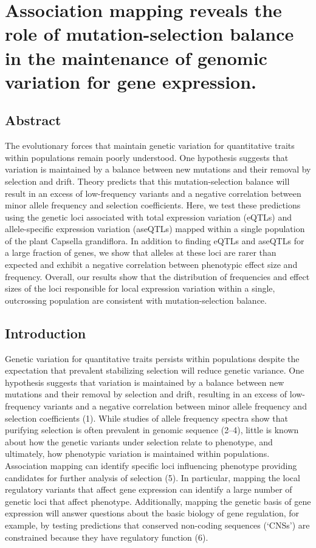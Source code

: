 \chapter{Association mapping reveals the role of mutation-selection balance in the maintenance of genomic variation for gene expression.}

\section{Abstract}
The evolutionary forces that maintain genetic variation for quantitative traits within populations remain poorly understood. One hypothesis suggests that variation is maintained by a balance between new mutations and their removal by selection and drift. Theory predicts that this mutation-selection balance will result in an excess of low-frequency variants and a negative correlation between minor allele frequency and selection coefficients. Here, we test these predictions using the genetic loci associated with total expression variation (eQTLs) and allele-specific expression variation (aseQTLs) mapped within a single population of the plant Capsella grandiflora. In addition to finding eQTLs and aseQTLs for a large fraction of genes, we show that alleles at these loci are rarer than expected and exhibit a negative correlation between phenotypic effect size and frequency. Overall, our results show that the distribution of frequencies and effect sizes of the loci responsible for local expression variation within a single, outcrossing population are consistent with mutation-selection balance.

\section{Introduction}
Genetic variation for quantitative traits persists within populations despite the expectation that prevalent stabilizing selection will reduce genetic variance. One hypothesis suggests that variation is maintained by a balance between new mutations and their removal by selection and drift, resulting in an excess of low-frequency variants and a negative correlation between minor allele frequency and selection coefficients (1). While studies of allele frequency spectra show that purifying selection is often prevalent in genomic sequence (2–4), little is known about how the genetic variants under selection relate to phenotype, and ultimately, how phenotypic variation is maintained within populations. Association mapping can identify specific loci influencing phenotype providing candidates for further analysis of selection (5). In particular, mapping the local regulatory variants that affect gene expression can identify a large number of genetic loci that affect phenotype. Additionally, mapping the genetic basis of gene expression will answer questions about the basic biology of gene regulation, for example, by testing predictions that conserved non-coding sequences (‘CNSs’) are constrained because they have regulatory function (6).

